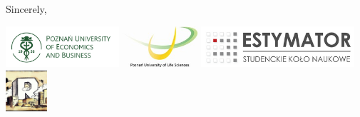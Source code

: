 \documentclass[10pt,a4paper]{letter}\usepackage[]{graphicx}\usepackage[]{color}
\begin{document}
\begin{letter}
\closing{Sincerely,}

\begin{center}
\includegraphics[height=0.6in]{uep}
\includegraphics[height=0.6in]{up}
\includegraphics[height=0.6in]{logo-estym}
\includegraphics[height=0.6in]{logo-erum}
\end{center}
\end{letter}
\end{document}
